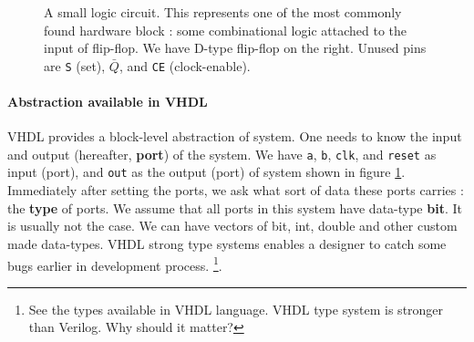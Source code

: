 \documentclass[a4paper,10pt]{article}
\begin{document}
  \begin{figure}[h] 
    \begin{center}  \end{center}

    \caption{A small logic circuit. This represents one of the most commonly
    found hardware block : some combinational logic attached to the input of
    flip-flop.  We have D-type flip-flop on the right. Unused pins are
    \texttt{S} (set), $\bar{Q}$, and \texttt{CE} (clock-enable).}
 
    \label{fig:circuit}
 
  \end{figure}

\paragraph{Abstraction available in VHDL}

  VHDL provides a block-level abstraction of system. One needs to know the input
  and output (hereafter, \textbf{port}) of the system. We have \texttt{a},
  \texttt{b}, \texttt{clk}, and \texttt{reset} as input (port), and \texttt{out}
  as the output (port) of system shown in figure \ref{fig:circuit}. Immediately
  after setting the ports, we ask what sort of data these ports carries : the
  \textbf{type} of ports.  We assume that all ports in this system have
  data-type \textbf{bit}. It is usually not the case. We can have vectors of
  bit, int, double and other custom made data-types. VHDL strong type systems
  enables a designer to catch some bugs earlier in development process.
  \footnote{See the types available in VHDL language.  VHDL type system is
  stronger than Verilog. Why should it matter?}.
\end{document}
